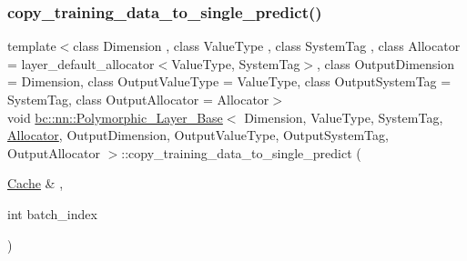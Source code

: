 \subsubsection{\texorpdfstring{copy\+\_\+training\+\_\+data\+\_\+to\+\_\+single\+\_\+predict()}{copy\_training\_data\_to\_single\_predict()}\hspace{0.1cm}{\footnotesize\ttfamily [2/2]}}
{\footnotesize\ttfamily template$<$class Dimension , class Value\+Type , class System\+Tag , class Allocator  = layer\+\_\+default\+\_\+allocator$<$\+Value\+Type, System\+Tag$>$, class Output\+Dimension  = Dimension, class Output\+Value\+Type  = Value\+Type, class Output\+System\+Tag  = System\+Tag, class Output\+Allocator  = Allocator$>$ \\
void \hyperlink{structbc_1_1nn_1_1Polymorphic__Layer__Base}{bc\+::nn\+::\+Polymorphic\+\_\+\+Layer\+\_\+\+Base}$<$ Dimension, Value\+Type, System\+Tag, \hyperlink{classbc_1_1allocators_1_1Allocator}{Allocator}, Output\+Dimension, Output\+Value\+Type, Output\+System\+Tag, Output\+Allocator $>$\+::copy\+\_\+training\+\_\+data\+\_\+to\+\_\+single\+\_\+predict (\begin{DoxyParamCaption}\item[{\hyperlink{structbc_1_1nn_1_1Cache}{Cache} \&}]{,  }\item[{int}]{batch\+\_\+index }\end{DoxyParamCaption})\hspace{0.3cm}{\ttfamily [inline]}}

\mbox{\label{structbc_1_1nn_1_1Polymorphic__Layer__Base_a0dc71591b6ca387501c2cace61be3e78}} 
